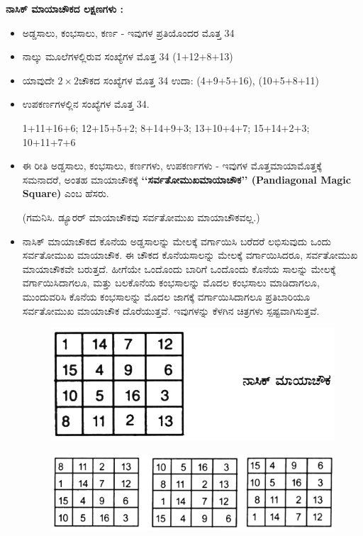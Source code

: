 \textbf{ನಾಸಿಕ್ ಮಾಯಾಚೌಕದ ಲಕ್ಷಣಗಳು :}

\begin{itemize}
	\item ಅಡ್ಡಸಾಲು, ಕಂಭಸಾಲು, ಕರ್ಣ - ಇವುಗಳ ಪ್ರತಿಯೊಂದರ ಮೊತ್ತ 34
	\item ನಾಲ್ಕು ಮೂಲೆಗಳಲ್ಲಿರುವ ಸಂಖ್ಯೆಗಳ ಮೊತ್ತ 34 (1+12+8+13)
	\item ಯಾವುದೇ $2 \times 2$ಚೌಕದ ಸಂಖ್ಯೆಗಳ ಮೊತ್ತ 34 ಉದಾ: (4+9+5+16), (10+5+8+11)
	\item ಉಪಕರ್ಣಗಳಲ್ಲಿನ ಸಂಖ್ಯೆಗಳ ಮೊತ್ತ 34.

	1+11+16+6; 12+15+5+2; 8+14+9+3; 13+10+4+7; 15+14+2+3; 10+11+7+6
	\item ಈ ರೀತಿ ಅಡ್ಡಸಾಲು, ಕಂಭಸಾಲು, ಕರ್ಣಗಳು, ಉಪಕರ್ಣಗಳು - ಇವುಗಳ ಮೊತ್ತ\break ಮಾಯಾಮೊತ್ತಕ್ಕೆ ಸಮನಾದರೆ, ಅಂತಹ ಮಾಯಾಚೌಕಕ್ಕೆ  \textbf{‘‘ಸರ್ವತೋಮುಖ\break ಮಾಯಾಚೌಕ’’ (Pandiagonal Magic Square)} ಎಂಬ ಹೆಸರು.

	(ಗಮನಿಸಿ. ಡ್ಯೂರರ್ ಮಾಯಾಚೌಕವು ಸರ್ವತೋಮುಖ ಮಾಯಾಚೌಕವಲ್ಲ.)
	
	\item ನಾಸಿಕ್ ಮಾಯಾಚೌಕದ ಕೊನೆಯ ಅಡ್ಡಸಾಲನ್ನು ಮೇಲಕ್ಕೆ ವರ್ಗಾಯಿಸಿ ಬರೆದರೆ ಲಭಿಸುವುದು ಒಂದು ಸರ್ವತೋಮುಖ ಮಾಯಾಚೌಕ. ಈ ಚೌಕದ ಕೊನೆಯ\break ಸಾಲನ್ನು ಮೇಲಕ್ಕೆ ವರ್ಗಾಯಿಸಿದರೂ, ಸರ್ವತೋಮುಖ ಮಾಯಾಚೌಕವೇ ಬರುತ್ತದೆ. ಹೀಗೆಯೇ ಒಂದೊಂದು ಬಾರಿಗೆ ಒಂದೊಂದು ಕೊನೆಯ ಸಾಲನ್ನು ಮೇಲಕ್ಕೆ ವರ್ಗಾಯಿಸಿದಾಗಲೂ, ಮತ್ತು ಬಲಕೊನೆಯ ಕಂಭಸಾಲನ್ನು ಮೊದಲ ಕಂಭಸಾಲು ಮಾಡಿದಾಗಲೂ, ಮುಂದುವರಿಸಿ ಕೊನೆಯ ಕಂಭಸಾಲನ್ನು ಮೊದಲ ಜಾಗಕ್ಕೆ ವರ್ಗಾಯಿಸಿದಾಗಲೂ ಪ್ರತಿಬಾರಿಯೂ ಸರ್ವತೋಮುಖ ಮಾಯಾಚೌಕ ದೊರೆಯುತ್ತವೆ. ಇವುಗಳನ್ನು ಕೆಳಗಿನ ಚಿತ್ರಗಳು ಸ್ಪಷ್ಟವಾಗಿಸುತ್ತವೆ.
	\begin{figure}[H]
	\includegraphics[scale=.8]{src/figures/chap4/fig4.3.jpg}
	\end{figure}
	\begin{figure}[H]
	\includegraphics[scale=.8]{src/figures/chap4/fig4.4.jpg}
	\end{figure}


\end{itemize}
